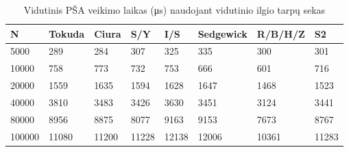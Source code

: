 \documentclass{VUMIFInfKursinis}
\begin{document}
\begin{table}[H]
  \caption{Vidutinis PŠA veikimo laikas (μs) naudojant vidutinio ilgio tarpų sekas}
  \label{iss_medium_runtimes}
  \begin{tabular}{|l|l|l|l|l|l|l|l|}
  \hline
  N      & Tokuda & Ciura & S/Y   & I/S   & Sedgewick & R/B/H/Z & S2   \\ \hline
  5000   & 289    & 284   & 307   & 325   & 335       & 300     & 301   \\ \hline
  10000  & 758    & 773   & 732   & 753   & 666       & 601     & 716   \\ \hline
  20000  & 1559   & 1635  & 1594  & 1628  & 1647      & 1468    & 1523  \\ \hline
  40000  & 3810   & 3483  & 3426  & 3630  & 3451      & 3124    & 3441  \\ \hline
  80000  & 8956   & 8875  & 8077  & 9163  & 9153      & 7673    & 8767  \\ \hline
  100000 & 11080  & 11200 & 11228 & 12138 & 12006     & 10361   & 11283 \\ \hline
  \end{tabular}
\end{table}
\end{document}
